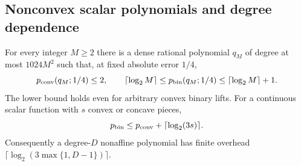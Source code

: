 \subsection{Nonconvex scalar polynomials and degree dependence}

\begin{theorem}
\label{thm:nonconvex-gap}
For every integer $M\ge2$ there is a dense rational polynomial $q_M$
of degree at most $1024M^2$ such that, at fixed absolute error $1/4$,
\begin{equation}\label{eq:nonconvex-gap-counts}
 p_{\mathrm{conv}}(q_M;1/4)\le2,\qquad
 \lceil\log_2M\rceil\le p_{\mathrm{bin}}(q_M;1/4)
 \le\lceil\log_2M\rceil+1.
\end{equation}
The lower bound holds even for arbitrary convex binary lifts.
For a continuous scalar function with $s$ convex or concave pieces,
\begin{equation}\label{eq:convexity-piece-bound}
 p_{\mathrm{bin}}\le p_{\mathrm{conv}}+\lceil\log_2(3s)\rceil.
\end{equation}
Consequently a degree-$D$ nonaffine polynomial has finite overhead
$\lceil\log_2(3\max\{1,D-1\})\rceil$.
\end{theorem}

